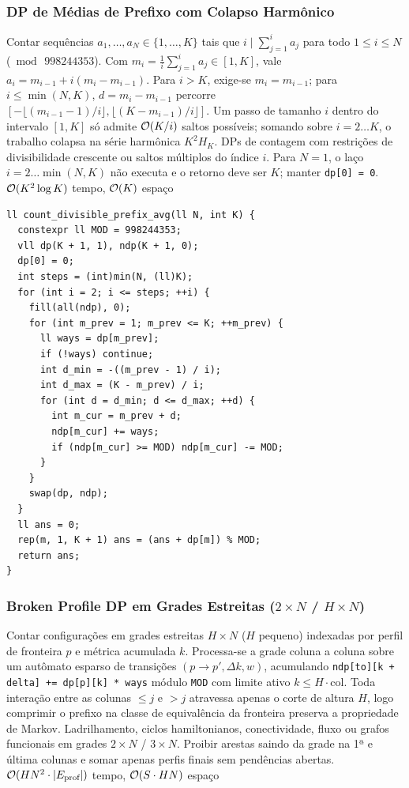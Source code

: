 \subsubsection{DP de Médias de Prefixo com Colapso Harmônico}
\algobox
  {Contar sequências $a_1, \dots, a_N \in \{1, \dots, K\}$ tais que $i \mid \sum_{j=1}^i a_j$ para todo $1 \le i \le N$ ($\bmod\, 998244353$).}
  {Com $m_i = \frac{1}{i}\sum_{j=1}^i a_j \in [1, K]$, vale $a_i = m_{i-1} + i(m_i - m_{i-1})$. Para $i > K$, exige-se $m_i = m_{i-1}$; para $i \le \min(N, K)$, $d = m_i - m_{i-1}$ percorre $[-\lfloor(m_{i-1}-1)/i\rfloor, \lfloor(K - m_{i-1})/i\rfloor]$.}
  {Um passo de tamanho $i$ dentro do intervalo $[1, K]$ só admite $\mathcal{O}(K / i)$ saltos possíveis; somando sobre $i = 2 \dots K$, o trabalho colapsa na série harmônica $K^2 H_K$.}
  {DPs de contagem com restrições de divisibilidade crescente ou saltos múltiplos do índice $i$.}
  {Para $N = 1$, o laço $i = 2 \dots \min(N, K)$ não executa e o retorno deve ser $K$; manter \texttt{dp[0] = 0}.}
  {$\mathcal{O}(K^2 \log K)$ tempo, $\mathcal{O}(K)$ espaço}

\begin{lstlisting}
ll count_divisible_prefix_avg(ll N, int K) {
  constexpr ll MOD = 998244353;
  vll dp(K + 1, 1), ndp(K + 1, 0);
  dp[0] = 0;
  int steps = (int)min(N, (ll)K);
  for (int i = 2; i <= steps; ++i) {
    fill(all(ndp), 0);
    for (int m_prev = 1; m_prev <= K; ++m_prev) {
      ll ways = dp[m_prev];
      if (!ways) continue;
      int d_min = -((m_prev - 1) / i);
      int d_max = (K - m_prev) / i;
      for (int d = d_min; d <= d_max; ++d) {
        int m_cur = m_prev + d;
        ndp[m_cur] += ways;
        if (ndp[m_cur] >= MOD) ndp[m_cur] -= MOD;
      }
    }
    swap(dp, ndp);
  }
  ll ans = 0;
  rep(m, 1, K + 1) ans = (ans + dp[m]) % MOD;
  return ans;
}
\end{lstlisting}

\subsubsection{Broken Profile DP em Grades Estreitas ($2 \times N$ / $H \times N$)}
\algobox
  {Contar configurações em grades estreitas $H \times N$ ($H$ pequeno) indexadas por perfil de fronteira $p$ e métrica acumulada $k$.}
  {Processa-se a grade coluna a coluna sobre um autômato esparso de transições $(p \to p', \Delta k, w)$, acumulando \texttt{ndp[to][k + delta] += dp[p][k] * ways} módulo \texttt{MOD} com limite ativo $k \le H \cdot \text{col}$.}
  {Toda interação entre as colunas $\le j$ e $> j$ atravessa apenas o corte de altura $H$, logo comprimir o prefixo na classe de equivalência da fronteira preserva a propriedade de Markov.}
  {Ladrilhamento, ciclos hamiltonianos, conectividade, fluxo ou grafos funcionais em grades $2 \times N$ / $3 \times N$.}
  {Proibir arestas saindo da grade na 1ª e última colunas e somar apenas perfis finais sem pendências abertas.}
  {$\mathcal{O}(H N^2 \cdot |E_{\text{prof}}|)$ tempo, $\mathcal{O}(S \cdot H N)$ espaço}

